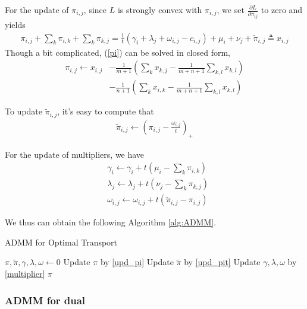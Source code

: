 \documentclass[english]{pkupaper}
\newenvironment{eqt}{\begin{equation}\begin{aligned}}{\end{aligned}\end{equation}}
\begin{document}
For the update of $\pi_{i,j}$, since $L$ is strongly convex with $\pi_{i,j}$, we set $\frac{\partial L}{\partial \pi_{ij}}$ to zero and yields
\begin{eqt}
\pi_{i,j} + \sum_{k}\pi_{i,k} + \sum_{k}\pi_{k,j} = \frac{1}{t}(\gamma_{i}+\lambda_{j}+\omega_{i,j}-c_{i,j}) + \mu_{i} + \nu_{j} + \tilde{\pi}_{i,j}\triangleq x_{i,j} \label{pi}
\end{eqt}
Though a bit complicated, (\ref{pi}) can be solved in closed form, 
\begin{eqt}
\label{upd_pi}
\pi_{i,j} \gets x_{i,j} & - \frac{1}{m+1}\left(\sum_kx_{k,j} - \frac{1}{m+n+1}\sum_{k, l}x_{k,l}\right)
\\& - \frac{1}{n+1}\left(\sum_kx_{i,k}-\frac{1}{m+n+1}\sum_{k, l}x_{k,l}\right)
\end{eqt}

To update $\tilde{\pi}_{i,j}$, it's easy to compute that
\begin{eqt}
\label{upd_pit}
\tilde{\pi}_{i,j} \gets (\pi_{i,j}-\frac{\omega_{i,j}}{t})_+
\end{eqt}

For the update of multipliers, we have 
\begin{eqt}
& \gamma_{i} \gets \gamma_i + t(\mu_i - \sum_k\pi_{i,k}) \\
& \lambda_{j} \gets \lambda_j + t(\nu_j - \sum_k\pi_{k,j}) \\
& \omega_{i, j} \gets \omega_{i, j} + t(\tilde{\pi}_{i, j} - \pi_{i, j}) \label{multiplier}
\end{eqt}

We thus can obtain the following Algorithm \ref{alg:ADMM}.

\begin{algorithm}
\caption{ADMM for Optimal Transport}
\label{alg:ADMM}
\begin{algorithmic}[1]
\STATE $\pi, \tilde{\pi}, \gamma, \lambda, \omega\gets 0$
	\STATE Update $\pi$ by \ref{upd_pi}
	\STATE Update $\tilde\pi$ by \ref{upd_pit}
	\STATE Update $\gamma, \lambda, \omega$  by \ref{multiplier}
\ENDWHILE
\RETURN $\pi$
\end{algorithmic}
\end{algorithm}

\subsubsection{ADMM for dual}
\end{document}
